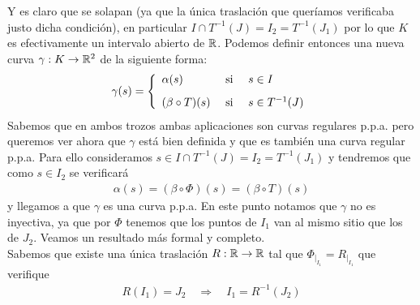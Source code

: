 \begin{observacion}
\begin{enumerate}
        Y es claro que se solapan (ya que la única traslación que queríamos verificaba justo dicha condición), en particular $I\cap T^{-1}(J) = I_2 = T^{-1}(J_1)$ por lo que $K$ es efectivamente un intervalo abierto de $\mathbb{R}$. Podemos definir entonces una nueva curva $\gamma:K \to \mathbb{R}^2$ de la siguiente forma:
        \begin{gather*}
            \gamma(s) = \left\{
                \begin{array}{l c l}
                    \alpha(s) & \text{ si } & s\in I\\[0.8em]
                    (\beta \circ T)(s) & \text{ si } & s \in T^{-1}(J)
                \end{array}
            \right.
        \end{gather*}
        Sabemos que en ambos trozos ambas aplicaciones son curvas regulares p.p.a. pero queremos ver ahora que $\gamma$ está bien definida y que es también una curva regular p.p.a. Para ello consideramos $s\in I\cap T^{-1}(J)=I_2 = T^{-1}(J_1)$ y tendremos que como $s\in I_2$ se verificará
        \begin{gather*}
            \alpha(s) = (\beta \circ \Phi)(s) = (\beta \circ T)(s)
        \end{gather*}
        y llegamos a que $\gamma$ es una curva p.p.a. En este punto notamos que $\gamma$ no es inyectiva, ya que por $\Phi$ tenemos que los puntos de $I_1$ van al mismo sitio que los de $J_2$. Veamos un resultado más formal y completo.\\

        Sabemos que existe una única traslación $R:\mathbb{R}\to \mathbb{R}$ tal que $\Phi_{|_{I_1}} = R_{|_{I_1}}$ que verifique 
        \begin{gather*}
            R(I_1) = J_2 \quad \Rightarrow \quad I_1 = R^{-1}(J_2)
        \end{gather*}
        \begin{figure}[H]
            \centering
\end{figure}
\end{enumerate}
\end{observacion}
